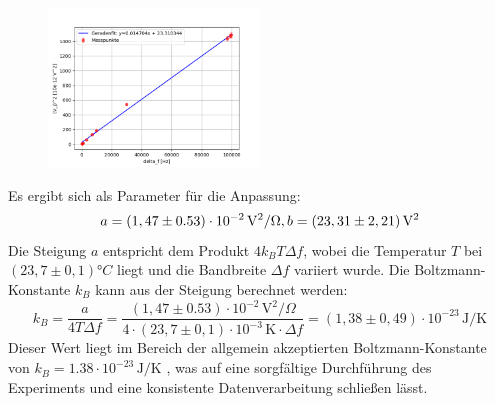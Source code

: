 \begin{figure}[htbp]
    \centering
    \includegraphics[width=0.5\textwidth]{figs/johnson_bandwith.png}
    \caption{}
    \label{fig:fit2}
\end{figure}
\FloatBarrier
Es ergibt sich als Parameter für die Anpassung:
\begin{equation}
a = (1,47 \pm 0.53) \cdot 10^{-2} \, \mathrm{V}^2/\Omega,   \\
b = (23,31 \pm 2,21) \, \mathrm{V}^2
\end{equation}
Die Steigung $a$ entspricht dem Produkt $4 k_B T \Delta f$, wobei die Temperatur $T$ bei $(23,7 \pm 0,1) °C$ liegt und die Bandbreite $\Delta f$ variiert wurde. Die Boltzmann-Konstante $k_B$ kann aus der Steigung berechnet werden:
\begin{equation}
k_B = \frac{a}{4 T \Delta f} = \frac{(1,47 \pm 0.53) \cdot 10^{-2} \,\mathrm{V}^2/\Omega}{4 \cdot (23,7 \pm 0,1) \cdot 10^{-3} \,\mathrm{K} \cdot \Delta f} = (1,38 \pm 0,49) \cdot 10^{-23} \,\mathrm{J/K}
\end{equation}
Dieser Wert liegt im Bereich der allgemein akzeptierten Boltzmann-Konstante von $k_B = 1.38 \cdot 10^{-23} \,\mathrm{J/K}$ \cite{boltzmann} %
, was auf eine sorgfältige Durchführung des Experiments und eine konsistente Datenverarbeitung schließen lässt.


